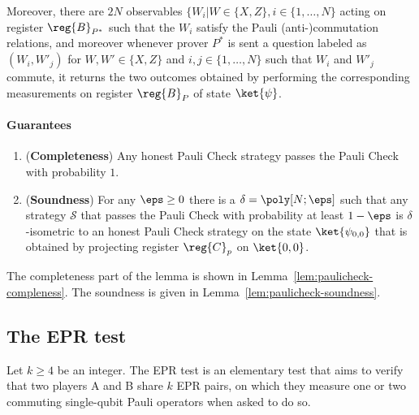 Moreover, there are $2N$ observables $\{W_i|W\in\{X,Z\},i\in\{1,\ldots,N\}$ acting on register $\reg{B}_{P^*}$ such that the $W_i$ satisfy the Pauli (anti-)commutation relations, and moreover whenever prover $P^*$ is sent a question labeled as $(W_i,W'_j)$ for $W,W'\in\{X,Z\}$ and $i,j\in\{1,\ldots,N\}$ such that $W_i$ and $W'_j$ commute, it returns the two outcomes obtained by performing the corresponding measurements on register $\reg{B}_P$ of state $\ket{\psi}$. 



\paragraph{Guarantees}


\begin{lemma}
\label{lem:pauli_check}
\leavevmode
\begin{enumerate}
	\item (\textbf{Completeness}) Any honest Pauli Check strategy passes the Pauli Check  with probability $1$.
	\item (\textbf{Soundness}) For any $\eps\geq 0$ there is a $\delta = \poly[N;\eps]$ such that any strategy $\mathcal{S}$ that passes the Pauli Check with probability at least $1 - \eps$ is $\delta$-isometric to an honest Pauli Check strategy on the state $\ket{\psi_{0,0}}$ that is obtained by projecting register $\reg{C}_p$ on $\ket{0,0}$. 
\end{enumerate}
\end{lemma}

The completeness part of the lemma is shown in Lemma~\ref{lem:paulicheck-compleness}. The soundness is given in Lemma~\ref{lem:paulicheck-soundness}. 





\subsection{The EPR test}

Let $k\geq 4$ be an integer. 
The EPR test is an elementary test that aims to verify that two players A and B share $k$ EPR pairs, on which they measure one or two commuting single-qubit Pauli operators when asked to do so. 

